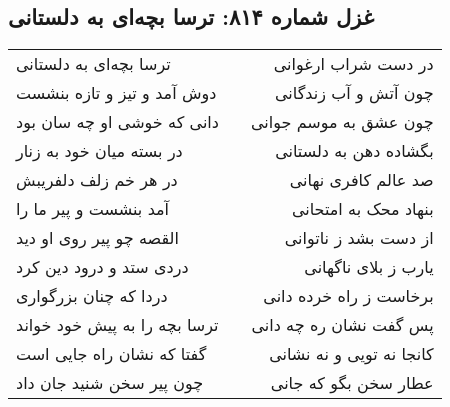 \begin{center}
\section*{غزل شماره ۸۱۴: ترسا بچه‌ای به دلستانی}
\label{sec:814}
\begin{longtable}{l p{0.5cm} r}
ترسا بچه‌ای به دلستانی
&&
در دست شراب ارغوانی
\\
دوش آمد و تیز و تازه بنشست
&&
چون آتش و آب زندگانی
\\
دانی که خوشی او چه سان بود
&&
چون عشق به موسم جوانی
\\
در بسته میان خود به زنار
&&
بگشاده دهن به دلستانی
\\
در هر خم زلف دلفریبش
&&
صد عالم کافری نهانی
\\
آمد بنشست و پیر ما را
&&
بنهاد محک به امتحانی
\\
القصه چو پیر روی او دید
&&
از دست بشد ز ناتوانی
\\
دردی ستد و درود دین کرد
&&
یارب ز بلای ناگهانی
\\
دردا که چنان بزرگواری
&&
برخاست ز راه خرده دانی
\\
ترسا بچه را به پیش خود خواند
&&
پس گفت نشان ره چه دانی
\\
گفتا که نشان راه جایی است
&&
کانجا نه تویی و نه نشانی
\\
چون پیر سخن شنید جان داد
&&
عطار سخن بگو که جانی
\\
\end{longtable}
\end{center}
